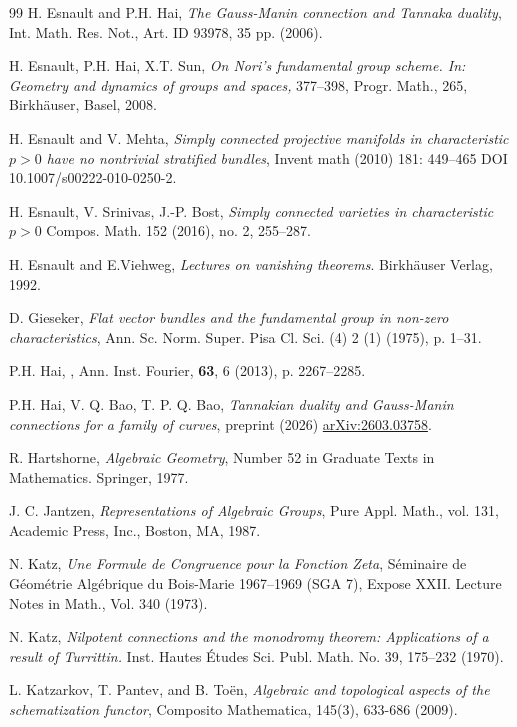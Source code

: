 \begin{thebibliography}{99}
 H. Esnault and P.H. Hai,  \textit{The Gauss-Manin connection and Tannaka duality}, Int. Math. Res. Not., Art. ID 93978, 35 pp. (2006). 

 H. Esnault, P.H. Hai, X.T. Sun, 
\textit{On Nori's fundamental group scheme. In: Geometry and dynamics of groups and spaces,}
 377--398, Progr. Math., 265, Birkh\"auser, Basel, 2008.

 H. Esnault and V. Mehta, 
\textit{Simply connected projective manifolds
in characteristic $p>0$ have no nontrivial stratified bundles}, Invent math (2010) 181: 449--465
DOI 10.1007/s00222-010-0250-2.

 H. Esnault, V. Srinivas, J.-P. Bost, \textit{ Simply connected varieties in characteristic  $p>0$} 
Compos. Math. 152 (2016), no. 2, 255--287.

 H. Esnault and  E.Viehweg,
\textit{Lectures on vanishing theorems}. Birkh\"auser Verlag, 1992.

 D. Gieseker, \textit{Flat vector bundles and the fundamental group in non-zero characteristics}, Ann. Sc.  Norm. Super. Pisa Cl. Sci. (4) 2 (1) (1975), p. 1--31. 

 P.H. Hai, , Ann. Inst. Fourier,  {\bf 63}, 6 (2013), p. 2267--2285.  

 P.H. Hai, V. Q. Bao,  T. P. Q. Bao, 
\textit{Tannakian duality and Gauss-Manin connections for a family of curves}, preprint (2026)  \url{arXiv:2603.03758}.
 
R. Hartshorne, \textit{Algebraic Geometry}, Number 52 in Graduate Texts in Mathematics. Springer, 1977.
 

 J. C. Jantzen, \emph{Representations of Algebraic Groups}, Pure Appl. Math., vol. 131, Academic Press, Inc., Boston, MA, 1987.
 
 N. Katz, \textit{Une Formule de Congruence pour la Fonction Zeta},
S\'eminaire de G\'eom\'etrie Alg\'ebrique du Bois-Marie 1967--1969 (SGA 7), Expose XXII.   
Lecture Notes in Math., Vol. 340 (1973).   
 
 N. Katz, \emph{Nilpotent connections and the monodromy theorem: Applications of a result of Turrittin.} 
 Inst. Hautes \'Etudes Sci. Publ. Math. No. 39, 175--232 (1970).

 L. Katzarkov, T. Pantev, and B. To\"en,  \textit{Algebraic and topological aspects of the schematization functor}, Composito Mathematica, 145(3), 633-686 (2009).


\end{thebibliography}
